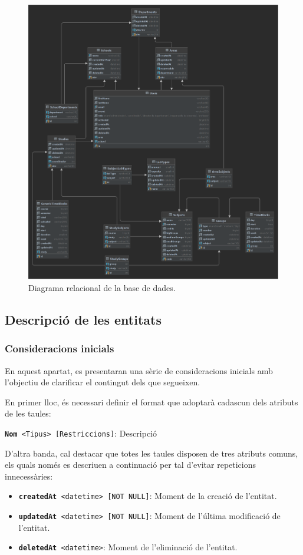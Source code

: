 \documentclass[a4paper,12pt]{ThesisStyle}
\begin{document}
\begin{figure}[H]
	\centering
	\includegraphics[width=\textwidth]{assets/db.pdf}
	\caption{\label{img:db}Diagrama relacional de la base de dades.}
\end{figure}

\subsection{Descripció de les entitats}
\label{subsec:bd_entitats}

\subsubsection{Consideracions inicials}

En aquest apartat, es presentaran una sèrie de consideracions inicials amb l'objectiu de clarificar el contingut dels que segueixen.

En primer lloc, és necessari definir el format que adoptarà cadascun dels atributs de les taules:
\\[8pt]
\centerline{\texttt{\textbf{Nom} <Tipus> [Restriccions]}: Descripció}

D'altra banda, cal destacar que totes les taules disposen de tres atributs comuns, els quals només es descriuen a continuació per tal d'evitar repeticions innecessàries:
\begin{itemize}
  \item \texttt{\textbf{createdAt} <datetime> [NOT NULL]}: Moment de la creació de l'entitat.
  \item \texttt{\textbf{updatedAt} <datetime> [NOT NULL]}: Moment de l'última modificació de l'entitat.
  \item \texttt{\textbf{deletedAt} <datetime>}: Moment de l'eliminació de l'entitat.
\end{itemize}
\end{document}
